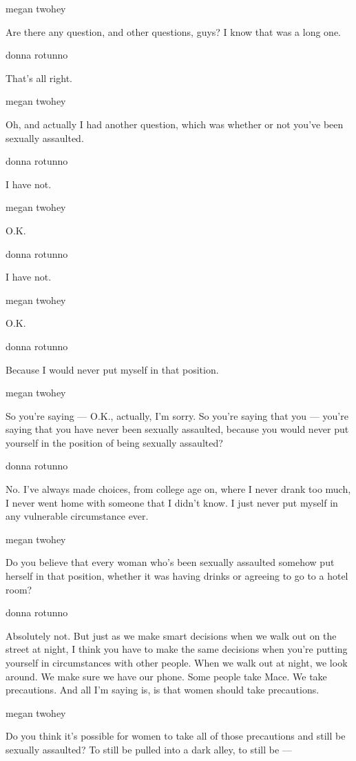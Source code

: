 megan twohey

Are there any question, and other questions, guys? I know that was a
long one.

donna rotunno

That's all right.

megan twohey

Oh, and actually I had another question, which was whether or not you've
been sexually assaulted.

donna rotunno

I have not.

megan twohey

O.K.

donna rotunno

I have not.

megan twohey

O.K.

donna rotunno

Because I would never put myself in that position.

megan twohey

So you're saying --- O.K., actually, I'm sorry. So you're saying that
you --- you're saying that you have never been sexually assaulted,
because you would never put yourself in the position of being sexually
assaulted?

donna rotunno

No. I've always made choices, from college age on, where I never drank
too much, I never went home with someone that I didn't know. I just
never put myself in any vulnerable circumstance ever.

megan twohey

Do you believe that every woman who's been sexually assaulted somehow
put herself in that position, whether it was having drinks or agreeing
to go to a hotel room?

donna rotunno

Absolutely not. But just as we make smart decisions when we walk out on
the street at night, I think you have to make the same decisions when
you're putting yourself in circumstances with other people. When we walk
out at night, we look around. We make sure we have our phone. Some
people take Mace. We take precautions. And all I'm saying is, is that
women should take precautions.

megan twohey

Do you think it's possible for women to take all of those precautions
and still be sexually assaulted? To still be pulled into a dark alley,
to still be ---

